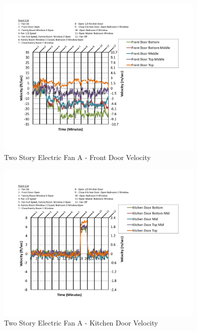 \documentclass{article}
\begin{document}
\begin{appendices}
	\begin{figure}[H]
		\centering
		\includegraphics[height=3.05in,trim=0.67in 1.1in 0.67in 0.8in,clip=true]{0_Images/Results_Charts/ColdFlow/Two_Story/Electric/A/Front_Door_Velocity.pdf}
		\caption{Two Story Electric Fan A - Front Door Velocity}
	\end{figure}
 

	\begin{figure}[H]
		\centering
		\includegraphics[height=3.05in,trim=0.67in 1.1in 0.67in 0.8in,clip=true]{0_Images/Results_Charts/ColdFlow/Two_Story/Electric/A/Kitchen_Door_Velocity.pdf}
		\caption{Two Story Electric Fan A - Kitchen Door Velocity}
	\end{figure}
 
	\clearpage


\end{appendices}
\end{document}
